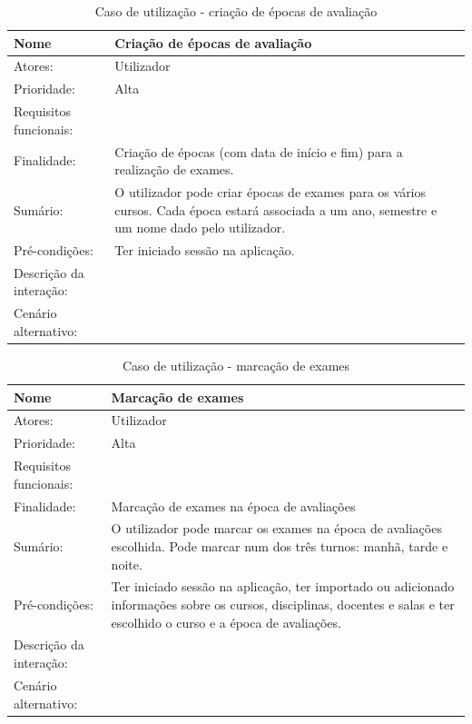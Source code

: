 \documentclass[11pt, twoside]{report}
\begin{document}
\begin{table}[H]
	\caption{Caso de utilização - criação de épocas de avaliação}
	\begin{center}	
		\begin{tabularx}{\textwidth}{|l|X|}
			\hline
			\textbf{Nome }	& \textbf{Criação de épocas de avaliação} \\
			\hline
			Atores: & Utilizador\\
			\hline
			Prioridade: &  Alta\\
			\hline
			Requisitos funcionais:&  \\
			\hline
			Finalidade: & Criação de épocas (com data de início e fim) para a realização de exames. \\
			\hline
			Sumário: & O utilizador pode criar épocas de exames para os vários cursos. Cada época estará associada a um ano, semestre e um nome dado pelo utilizador.\\
			\hline
			Pré-condições: & Ter iniciado sessão na aplicação.\\
			\hline
			Descrição da interação: &  \\
			\hline
			Cenário alternativo: &\\
			\hline
		\end{tabularx}
	\end{center}
\end{table}


\begin{table}[H]
	\caption{Caso de utilização - marcação de exames}
	\begin{center}	
		\begin{tabularx}{\textwidth}{|l|X|}
			\hline
			\textbf{Nome }	& \textbf{Marcação de exames} \\
			\hline
			Atores: & Utilizador\\
			\hline
			Prioridade: &  Alta\\
			\hline
			Requisitos funcionais:&  \\
			\hline
			Finalidade: & Marcação de exames na época de avaliações\\
			\hline
			Sumário: & O utilizador pode marcar os exames na época de avaliações escolhida. Pode marcar num dos três turnos: manhã, tarde e noite.\\
			\hline
			Pré-condições: & Ter iniciado sessão na aplicação, ter importado ou adicionado informações sobre os cursos, disciplinas, docentes e salas e ter escolhido o curso e a época de avaliações.\\
			\hline
			Descrição da interação: &  \\
			\hline
			Cenário alternativo: &\\
			\hline
		\end{tabularx}
	\end{center}
\end{table}
\end{document}
